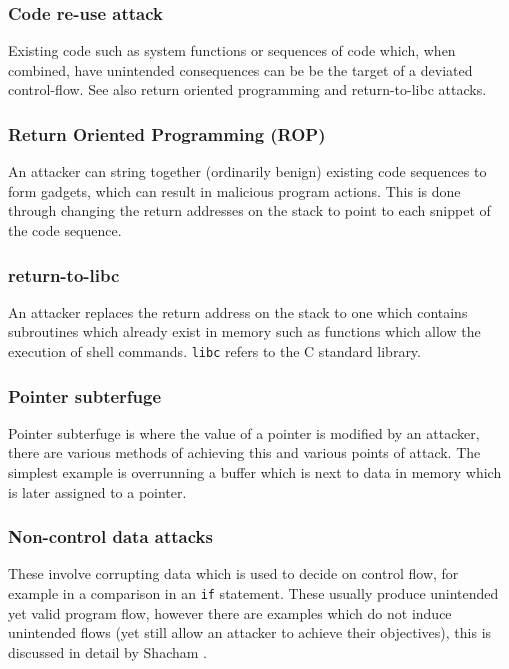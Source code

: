 \subsubsection{Code re-use attack}
Existing code such as system functions or sequences of code which, when combined, have unintended consequences can be be the target of a deviated control-flow. See also return oriented programming and return-to-libc attacks.

\subsubsection{Return Oriented Programming (ROP)}
An attacker can string together (ordinarily benign) existing code sequences to form gadgets, which can result in malicious program actions. This is done through changing the return addresses on the stack to point to each snippet of the code sequence.

\subsubsection{return-to-libc}

An attacker replaces the return address on the stack to one which contains subroutines which already exist in memory such as functions which allow the execution of shell commands. \verb|libc| refers to the C standard library.

\subsubsection{Pointer subterfuge}

Pointer subterfuge is where the value of a pointer is modified by an attacker, there are various methods of achieving this and various points of attack. The simplest example is overrunning a buffer which is next to data in memory which is later assigned to a pointer.

\subsubsection{Non-control data attacks}
These involve corrupting data which is used to decide on control flow, for example in a comparison in an \verb|if| statement. These usually produce unintended yet valid program flow, however there are examples which do not induce unintended flows (yet still allow an attacker to achieve their objectives), this is discussed in detail by Shacham \cite{Shacham2007}.